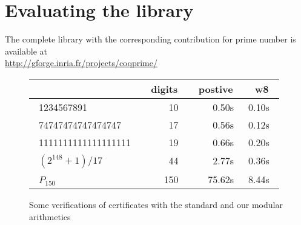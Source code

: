\section{Evaluating the library \label{bench}}

The complete library with the corresponding contribution for prime number is available at\\
\url{http://gforge.inria.fr/projects/coqprime/}\\
\begin{figure}
\begin{center}
\begin{tabular}{|l|r| r|r|}
\hline
 & ~digits~ & ~postive~ & ~w8~ \\
\hline
~1234567891       ~  & 10~  & 0.50s~  & 0.10s~  \\
~74747474747474747~  & 17~ & 0.56s~  & 0.12s~  \\
~1111111111111111111~ & 19~ & 0.66s~ & 0.20s~  \\
~$(2^{148}+1)/17$ ~   & 44~ & 2.77s~  & 0.36s~  \\
~$P_{150}$   ~       & 150~ & 75.62s~  & 8.44s~  \\
\hline
\end{tabular}
\end{center}
\caption{Some verifications of certificates with the standard and our modular arithmetics}
\label{fig:TimeCompW}
\end{figure} 

